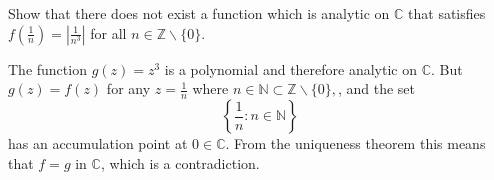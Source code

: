 \documentclass{article}
\newcounter{Problem}
\newenvironment{Problem}{\begin{Exercise}[name={Problem},
                                          counter={Problem}]}
                        {\end{Exercise}}
\begin{document}
\begin{Problem}
  Show that there does not exist a function which is analytic on
  $\mathbb{C}$ that satisfies
  $f\left(\frac{1}{n}\right) = \left|\frac{1}{n^3}\right|$ for all
  $n \in \mathbb{Z} \backslash \{ 0 \}$.
\end{Problem}

\begin{Answer}
  The function $g(z) = z^3$ is a polynomial and therefore analytic
  on $\mathbb{C}$. But $g(z) = f(z)$ for any $z = \frac{1}{n}$ where
  $n \in \mathbb{N} \subset \mathbb{Z} \backslash \{0\},$, and the set
  $$
  \left\{\frac{1}{n} : n \in \mathbb{N} \right\}
  $$
  has an accumulation point at $0 \in \mathbb{C}$. From the uniqueness theorem
  this means that $f = g$ in $\mathbb{C}$, which is a contradiction.
\end{Answer}
\end{document}

